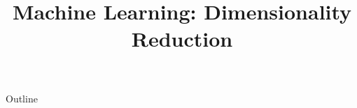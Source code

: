\documentclass[xcolor=dvipsnames,compress,t,pdf,9pt]{beamer}
\title[\insertframenumber /\inserttotalframenumber]{Machine Learning: Dimensionality Reduction}
\begin{document}
	\begin{frame}
	\titlepage
	\end{frame}

	\begin{frame}{Outline}
	    \tableofcontents
	\end{frame}

	
	
	
\end{document}
